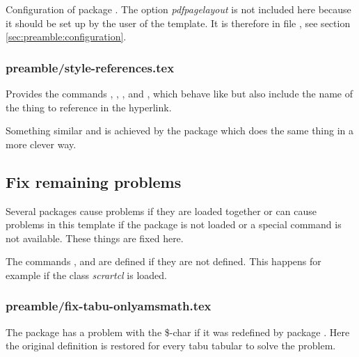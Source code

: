 Configuration of package . The option \emph{pdfpagelayout} is not included here because it should be set up by the user of the template. It is therefore in file , see section \vref{sec:preamble:configuration}.


\subsubsection{preamble/style-references.tex}

Provides the commands , , ,  and , which behave like  but also include the name of the thing to reference in the hyperlink.

Something similar and is achieved by the package  which does the same thing in a more clever way.


\subsection{Fix remaining problems}
\label{sec:style:fix}

Several packages cause problems if they are loaded together or can cause problems in this template if the package is not loaded or a special command is not available. These things are fixed here.

The commands ,  and  are defined if they are not defined. This happens for example if the class \emph{scrartcl} is loaded.


\subsubsection{preamble/fix-tabu-onlyamsmath.tex}

The package  has a problem with the \$-char if it was redefined by package . Here the original definition is restored for every tabu tabular to solve the problem.

